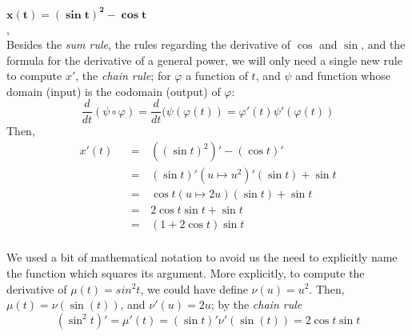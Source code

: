 \documentclass[solutions.tex]{subfiles}
\begin{document}
\hr
$\bm{x(t) = (\sin t)^2 - \cos t}$ \\, \\
Besides the \textit{sum rule}, the rules regarding the derivative
of $\cos$ and $\sin$, and the formula for the derivative of a general
power, we will only need a single new rule to compute $x'$, the \textit{chain rule};
for $\varphi$ a function of $t$, and $\psi$ and function whose domain (input)
is the codomain (output) of $\varphi$:
\[
	\frac{d}{dt}(\psi\circ\varphi) = \frac{d}{dt}(\psi(\varphi(t)) = \varphi'(t)\psi'(\varphi(t))
\]
Then,
\begin{equation*} \begin{aligned}
	x'(t) &&=\,& ((\sin t)^2)'-(\cos t)' \\
	~ &&=\,& (\sin t)'(u \mapsto u^2)'(\sin t) + \sin t \\
	~ &&=\,& \cos t (u \mapsto 2u)(\sin t) + \sin t \\
	~ &&=\,& 2\cos t\sin t + \sin t \\
	~ &&=\,& \boxed{(1+2\cos t)\sin t} \\
\end{aligned} \end{equation*}
\begin{remark} We used a bit of mathematical notation to avoid us the need
to explicitly name the function which squares its argument. More explicitly,
to compute the derivative of $\mu(t) = sin^2t$, we could have define
$\nu(u) = u^2$. Then, $\mu(t) = \nu(\sin(t))$, and $\nu'(u) = 2u$;
by the \textit{chain rule}
\[
	(\sin^2 t)' = \mu'(t) = (\sin t)'\nu'(\sin(t)) = 2\cos t\sin t
\]
\end{remark}
\end{document}
